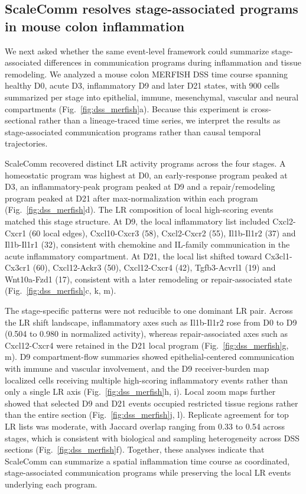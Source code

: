 \documentclass[referee,lineno,pdflatex,sn-vancouver-num]{sn-jnl}
\begin{document}
\subsection{ScaleComm resolves stage-associated programs in mouse colon inflammation}

We next asked whether the same event-level framework could summarize stage-associated differences in communication programs during inflammation and tissue remodeling. We analyzed a mouse colon MERFISH DSS time course spanning healthy D0, acute D3, inflammatory D9 and later D21 states, with 900 cells summarized per stage into epithelial, immune, mesenchymal, vascular and neural compartments (Fig.~\ref{fig:dss_merfish}a). Because this experiment is cross-sectional rather than a lineage-traced time series, we interpret the results as stage-associated communication programs rather than causal temporal trajectories.

ScaleComm recovered distinct LR activity programs across the four stages. A homeostatic program was highest at D0, an early-response program peaked at D3, an inflammatory-peak program peaked at D9 and a repair/remodeling program peaked at D21 after max-normalization within each program (Fig.~\ref{fig:dss_merfish}d). The LR composition of local high-scoring events matched this stage structure. At D9, the local inflammatory list included Cxcl2-Cxcr1 (60 local edges), Cxcl10-Cxcr3 (58), Cxcl2-Cxcr2 (55), Il1b-Il1r2 (37) and Il1b-Il1r1 (32), consistent with chemokine and IL-family communication in the acute inflammatory compartment. At D21, the local list shifted toward Cx3cl1-Cx3cr1 (60), Cxcl12-Ackr3 (50), Cxcl12-Cxcr4 (42), Tgfb3-Acvrl1 (19) and Wnt10a-Fzd1 (17), consistent with a later remodeling or repair-associated state (Fig.~\ref{fig:dss_merfish}c, k, m).

The stage-specific patterns were not reducible to one dominant LR pair. Across the LR shift landscape, inflammatory axes such as Il1b-Il1r2 rose from D0 to D9 (0.504 to 0.980 in normalized activity), whereas repair-associated axes such as Cxcl12-Cxcr4 were retained in the D21 local program (Fig.~\ref{fig:dss_merfish}g, m). D9 compartment-flow summaries showed epithelial-centered communication with immune and vascular involvement, and the D9 receiver-burden map localized cells receiving multiple high-scoring inflammatory events rather than only a single LR axis (Fig.~\ref{fig:dss_merfish}h, i). Local zoom maps further showed that selected D9 and D21 events occupied restricted tissue regions rather than the entire section (Fig.~\ref{fig:dss_merfish}j, l). Replicate agreement for top LR lists was moderate, with Jaccard overlap ranging from 0.33 to 0.54 across stages, which is consistent with biological and sampling heterogeneity across DSS sections (Fig.~\ref{fig:dss_merfish}f). Together, these analyses indicate that ScaleComm can summarize a spatial inflammation time course as coordinated, stage-associated communication programs while preserving the local LR events underlying each program.
\end{document}
